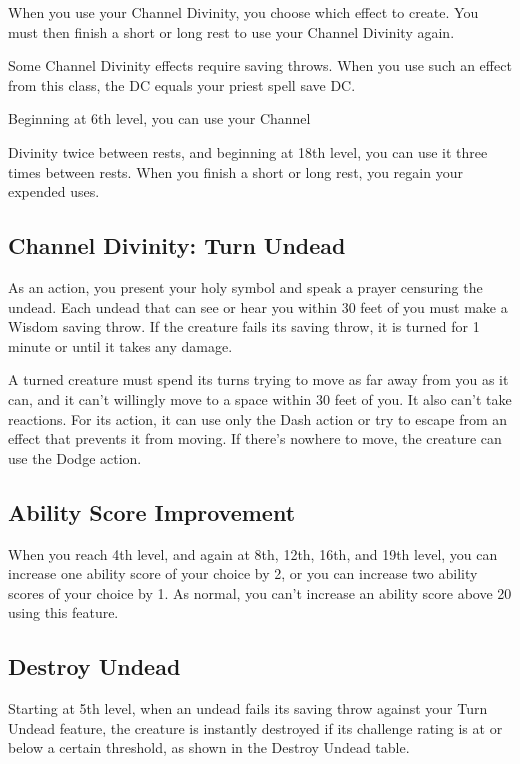 When you use your Channel Divinity, you choose which effect to create. You must then finish a short or long rest to use your Channel Divinity again.

Some Channel Divinity effects require saving throws. When you use such an effect from this class, the DC equals your priest spell save DC.

Beginning at 6th level, you can use your Channel

Divinity twice between rests, and beginning at 18th level, you can use it three times between rests. When you finish a short or long rest, you regain your expended uses.

\subsection{Channel Divinity: Turn Undead}

As an action, you present your holy symbol and speak a prayer censuring the undead. Each undead that can see or hear you within 30 feet of you must make a Wisdom saving throw. If the creature fails its saving throw, it is turned for 1 minute or until it takes any damage.

A turned creature must spend its turns trying to move as far away from you as it can, and it can't willingly move to a space within 30 feet of you. It also can't take reactions. For its action, it can use only the Dash action or try to escape from an effect that prevents it from moving. If there's nowhere to move, the creature can use the Dodge action.

\subsection{Ability Score Improvement}

When you reach 4th level, and again at 8th, 12th, 16th, and 19th level, you can increase one ability score of your choice by 2, or you can increase two ability scores of your choice by 1. As normal, you can't increase an ability score above 20 using this feature.

\subsection{Destroy Undead}

Starting at 5th level, when an undead fails its saving throw against your Turn Undead feature, the creature is instantly destroyed if its challenge rating is at or below a certain threshold, as shown in the Destroy Undead table.

